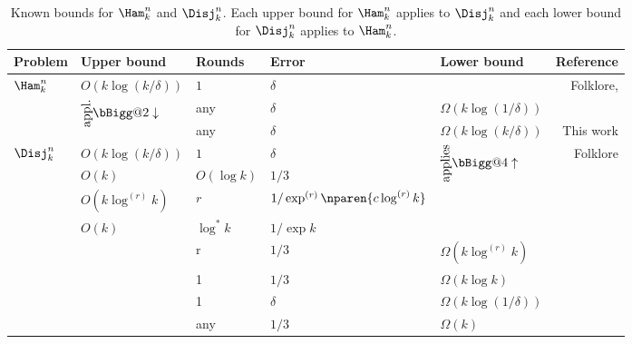 \begin{table}[]
\def\arraystretch{1.2}
\makeatletter
\newcommand{\mleftarrow}{\rotatebox[origin=c]{90}{appl.}\bBigg@{2}\downarrow}
\newcommand{\mrightarro}{\rotatebox[origin=c]{90}{applies}\bBigg@{4}\uparrow}
\makeatother
\begin{tabular}{lllllr}
{\bf Problem}			& {\bf Upper bound}		& {\bf Rounds}			& {\bf Error}    			& {\bf Lower bound}		& {\bf Reference} \\\hline
\multirow{3}{*}{$\Ham^n_k$}	& $O(k\log (k/\delta))$		& $1$				& $\delta$				&				& Folklore, \cite{HuangSZZ2006}\\
				& \multirow{2}{*}{$\mleftarrow$}& any				& $\delta$				& $\Omega(k\log(1/\delta))$	& \cite{BlaisBG2014}\\
				&				& any				& $\delta$				& $\Omega(k\log(k/\delta))$ 	& This work\\
\hline
\multirow{8}{*}{$\Disj^n_k$}	& $O(k\log (k/\delta))$		& $1$				& $\delta$				& \multirow{4}{*}{$\mrightarro$}& Folklore          \\
				& $O(k)$			& $O(\log k)$			& $1/3$					&				& \cite{HastadW2007}\\
                              	& $O(k\log^{(r)}k)$		& $r$				& $1/\exp^{(r)}\nparen{c\log^{(r)} k}$	&				& \cite{SaglamT2013}\\
			      	& $O(k)$			& $\log^* k$			& $1/\exp k$				&				& \cite{SaglamT2013}\\
				&				& r				& $1/3$					& $\Omega(k \log^{(r)} k)$	& \cite{SaglamT2013}\\
				&				& 1				& $1/3$					& $\Omega(k\log k)$ 		& \cite{BuhrmanGMW2012, DasguptaKS12}\\
				&				& 1				& $\delta$				& $\Omega(k \log(1/\delta))$	& \cite{Saglam2011,JayramW2011}\\
				&				& any				& $1/3$					& $\Omega(k)$			& \cite{KalyanasundaramS1992}\\
\hline
\end{tabular}
\caption[Comparison of $\Ham^n_k$ and $\Disj^n_k$ bounds]{Known bounds for $\Ham^n_k$ and $\Disj^n_k$. 
Each upper bound for $\Ham^{n}_k$ applies to $\Disj^n_k$ 
and each lower bound for $\Disj^n_k$ applies to $\Ham^n_k$.}
\label{table:hamvsdisj}
\end{table}
